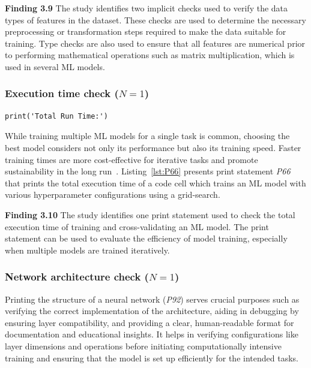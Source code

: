\documentclass[smallextended]{svjour3}       %
\newcommand{\highlight}[1]{\begin{framed}%
  \noindent#1
\end{framed}}
\begin{document}
\highlight{\textbf{Finding 3.9} The study identifies two implicit checks used to verify the data types of features in the dataset. These checks are used to determine the necessary preprocessing or transformation steps required to make the data suitable for training. Type checks are also used to ensure that all features are numerical prior to performing mathematical operations such as matrix multiplication, which is used in several ML models.}

\subsubsection{Execution time check ($N = 1$)}
\begin{lstlisting}[caption={Print statement \emph{P66} used to check the total execution time of training an ML model with various hyper-parameter configurations.}, label={lst:P66}]
print('Total Run Time:')
\end{lstlisting}

While training multiple ML models for a single task is common, choosing the best model considers not only its performance but also its training speed. Faster training times are more cost-effective for iterative tasks and promote sustainability in the long run~\citep{shome2022data}. Listing~\ref{lst:P66} presents print statement \emph{P66} that prints the total execution time of a code cell which trains an ML model with various hyperparameter configurations using a grid-search.

\highlight{\textbf{Finding 3.10} The study identifies one print statement used to check the total execution time of training and cross-validating an ML model. The print statement can be used to evaluate the efficiency of model training, especially when multiple models are trained iteratively.}

\subsubsection{Network architecture check ($N = 1$)}

Printing the structure of a neural network (\emph{P92}) serves crucial purposes such as verifying the correct implementation of the architecture, aiding in debugging by ensuring layer compatibility, and providing a clear, human-readable format for documentation and educational insights. It helps in verifying configurations like layer dimensions and operations before initiating computationally intensive training and ensuring that the model is set up efficiently for the intended tasks.
\end{document}

